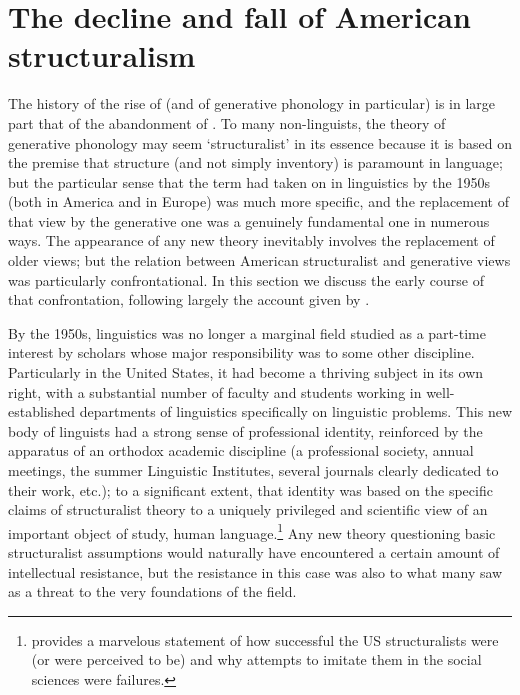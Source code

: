 \section{The decline and fall of American structuralism}
\label{sec:decline-fall}
The history of the rise of  (and of generative
phonology in particular) is in large part that of the abandonment of
. To many non-linguists, the theory of generative
phonology may seem `structuralist' in its essence because it is based
on the premise that structure (and not simply inventory) is paramount
in language; but the particular sense that the term had taken on in
linguistics by the 1950s (both in America and in Europe) was much more
specific, and the replacement of that view by the generative one was a
genuinely fundamental one in numerous ways. The appearance of any new
theory inevitably involves the replacement of older views; but the
relation between American structuralist and generative views was
particularly confrontational. In this section we discuss the early
course of that confrontation, following largely the account given by
\citet{newmeyer:ltia2}.

By the 1950s, linguistics was no longer a marginal field studied as a
part-time interest by scholars whose major responsibility was to some
other discipline. Particularly in the United States, it had become a
thriving subject in its own right, with a substantial number of
faculty and students working in well-established departments of
linguistics specifically on linguistic problems. This new body of
linguists had a strong sense of professional identity, reinforced by
the apparatus of an orthodox academic discipline (a professional
society, annual meetings, the summer Linguistic Institutes, several
journals clearly dedicated to their work, etc.); to a significant
extent, that identity was based on the specific claims of
structuralist theory to a uniquely privileged and scientific view of
an important object of study, human
language.\footnote{\citet{greenberg73:pilot} provides a marvelous
  statement of how successful the US structuralists were (or were
  perceived to be) and why attempts to imitate them in the social
  sciences were failures.} Any new theory questioning basic
structuralist assumptions would naturally have encountered a certain
amount of intellectual resistance, but the resistance in this case was
also to what many saw as a threat to the very foundations of the
field.

